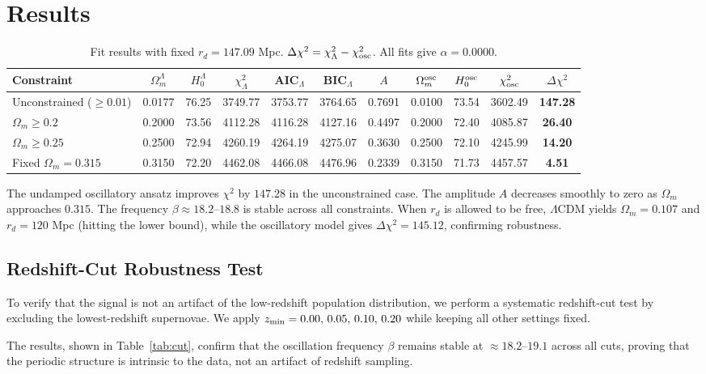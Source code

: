 \documentclass[10pt,a4paper,twocolumn]{article}
\begin{document}
\section{Results}
\begin{table}[ht]
\centering
\caption{Fit results with fixed $r_d=147.09$ Mpc. $\Delta\chi^2 = \chi^2_{\Lambda} - \chi^2_{\rm osc}$. All fits give $\alpha=0.0000$.}
\label{tab:results}
\begin{tabular}{lcccccccccc}
\toprule
Constraint & $\Omega_m^\Lambda$ & $H_0^\Lambda$ & $\chi^2_\Lambda$ & AIC$_\Lambda$ & BIC$_\Lambda$ & $A$ & $\Omega_m^{\rm osc}$ & $H_0^{\rm osc}$ & $\chi^2_{\rm osc}$ & $\Delta\chi^2$ \\
\midrule
Unconstrained ($\ge0.01$) & 0.0177 & 76.25 & 3749.77 & 3753.77 & 3764.65 & 0.7691 & 0.0100 & 73.54 & 3602.49 & \textbf{147.28} \\
$\Omega_m\ge0.2$         & 0.2000 & 73.56 & 4112.28 & 4116.28 & 4127.16 & 0.4497 & 0.2000 & 72.40 & 4085.87 & \textbf{26.40} \\
$\Omega_m\ge0.25$        & 0.2500 & 72.94 & 4260.19 & 4264.19 & 4275.07 & 0.3630 & 0.2500 & 72.10 & 4245.99 & \textbf{14.20} \\
Fixed $\Omega_m=0.315$   & 0.3150 & 72.20 & 4462.08 & 4466.08 & 4476.96 & 0.2339 & 0.3150 & 71.73 & 4457.57 & \textbf{4.51} \\
\bottomrule
\end{tabular}
\end{table}

The undamped oscillatory ansatz improves $\chi^2$ by $147.28$ in the unconstrained case. The amplitude $A$ decreases smoothly to zero as $\Omega_m$ approaches $0.315$. The frequency $\beta\approx18.2$–$18.8$ is stable across all constraints. When $r_d$ is allowed to be free, $\Lambda$CDM yields $\Omega_m=0.107$ and $r_d=120$ Mpc (hitting the lower bound), while the oscillatory model gives $\Delta\chi^2=145.12$, confirming robustness.

\subsection{Redshift-Cut Robustness Test}
To verify that the signal is not an artifact of the low-redshift population distribution, we perform a systematic redshift-cut test by excluding the lowest-redshift supernovae. We apply $z_{\rm min} = 0.00,\,0.05,\,0.10,\,0.20$ while keeping all other settings fixed.

The results, shown in Table~\ref{tab:cut}, confirm that the oscillation frequency $\beta$ remains stable at $\boldsymbol{\approx 18.2–19.1}$ across all cuts, proving that the periodic structure is intrinsic to the data, not an artifact of redshift sampling.
\end{document}
